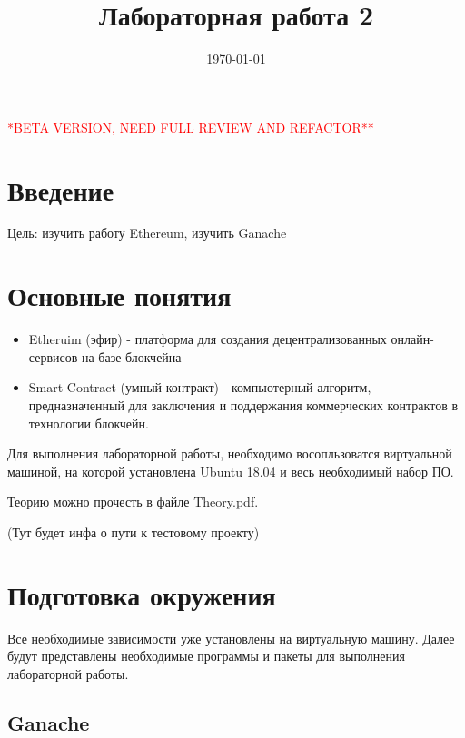 \documentclass{article}
\begin{document}
	
\textcolor{red}{{\huge **BETA VERSION, NEED FULL REVIEW AND REFACTOR**}}
	
\title{Лабораторная работа 2}

\date{\today}
\maketitle


\section{Введение}

Цель: изучить работу Ethereum, изучить Ganache


\section{Основные понятия}

\begin{itemize}
	\item Etheruim (эфир) -  платформа для создания децентрализованных онлайн-сервисов на базе блокчейна
	\item Smart Contract (умный контракт) - компьютерный алгоритм, предназначенный для заключения и поддержания коммерческих контрактов в технологии блокчейн. 	
\end{itemize}


Для выполнения лабораторной работы, необходимо восопльзоватся виртуальной машиной, на которой установлена Ubuntu 18.04 и весь необходимый набор ПО.

Теорию можно прочесть в файле Theory.pdf.

(Тут будет инфа о пути к тестовому проекту)


\section{Подготовка окружения}

Все необходимые зависимости уже установлены на виртуальную машину. Далее будут представлены необходимые программы и пакеты для выполнения лабораторной работы. 

\subsection{Ganache}
\end{document}
